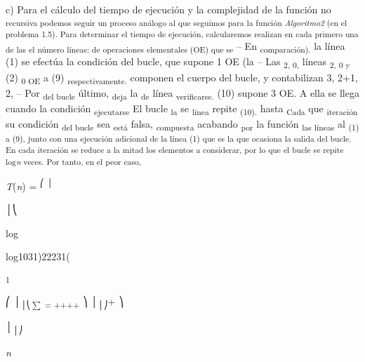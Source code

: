 \documentclass[12pt]{article}
\renewcommand{\_}{\kern-1.5pt\textunderscore\kern-1.5pt}
\begin{document}
\begin{justify}
{\fontsize{10pt}{12.0pt}\selectfont c) Para el cálculo del tiempo de ejecución y la complejidad de la función no \textsubscript{recursiva podemos seguir un proceso análogo al que seguimos para la función \textit{Algoritmo2 }(en el problema 1.5). Para determinar el tiempo de ejecución, calcularemos realizan en cada primero una de las el número líneas: de operaciones elementales (OE) que se }– En \textsubscript{comparación). }la línea (1) se efectúa la condición del bucle, que supone 1 OE (la – Las \textsubscript{2, 0, }líneas \textsubscript{2, 0 y }(2) \textsubscript{0 OE }a (9) \textsubscript{respectivamente. }componen el cuerpo del bucle, y contabilizan 3, 2+1, 2, – Por \textsubscript{del bucle }último, \textsubscript{deja }la \textsubscript{de }línea \textsubscript{verificarse. }(10) supone 3 OE. A ella se llega cuando la condición \textsubscript{ejecutarse }El bucle \textsubscript{la }se \textsubscript{línea }repite \textsubscript{(10). }hasta \textsubscript{Cada }que \textsubscript{iteración }su condición \textsubscript{del bucle }sea \textsubscript{está }falsa, \textsubscript{compuesta }acabando \textsubscript{por }la función \textsubscript{las líneas }al \textsubscript{(1) a (9), junto con una ejecución adicional de la línea (1) que es la que ocasiona la salida del bucle. En cada iteración se reduce a la mitad los elementos a considerar, por lo que el bucle se repite log\textit{n }veces. Por tanto, en el peor caso, }\par}
\end{justify}\par

{\fontsize{10pt}{12.0pt}\selectfont \textit{T}(\textit{n}) = \textsuperscript{⎛ │}{\fontsize{11pt}{13.2pt}\selectfont │⎝{\fontsize{6pt}{7.2pt}\selectfont log{\fontsize{11pt}{13.2pt}\selectfont log1031)22231( \par}\par}\par}\par}\par

\textsubscript{1 }{\fontsize{11pt}{13.2pt} ⎛ │\textsubscript{│⎝$ \sum $ = ++++ }⎞ │\textsubscript{│⎠}+ ⎞ \par}\par

{\fontsize{11pt}{13.2pt}\selectfont │\textsubscript{│⎠}{\fontsize{7pt}{8.4pt}\selectfont \textit{n }\par}\par}\par
\end{document}
